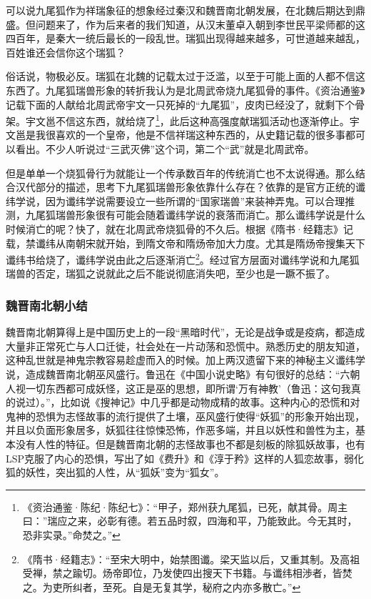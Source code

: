 \documentclass[UTF8, 12pt, A4paper]{article}
\begin{document}
可以说九尾狐作为祥瑞象征的想象经过秦汉和魏晋南北朝发展，在北魏后期达到鼎盛。但问题来了，作为后来者的我们知道，从汉末董卓入朝到李世民平梁师都的这四百年，是秦大一统后最长的一段乱世。瑞狐出现得越来越多，可世道越来越乱，百姓谁还会信你这个瑞狐？

俗话说，物极必反。瑞狐在北魏的记载太过于泛滥，以至于可能上面的人都不信这东西了。九尾狐瑞兽形象的转折我认为是北周武帝烧九尾狐骨的事件。《资治通鉴》记载下面的人献给北周武帝宇文一只死掉的“九尾狐”，皮肉已经没了，就剩下个骨架。宇文邕不信这东西，就给烧了\footnote{《资治通鉴·陈纪·陈纪七》：“甲子，郑州获九尾狐，已死，献其骨。周主曰：”瑞应之来，必彰有德。若五品时叙，四海和平，乃能致此。今无其时，恐非实录。”命焚之。”}，此后这种高强度献瑞狐活动也逐渐停止。宇文邕是我很喜欢的一个皇帝，他是不信祥瑞这种东西的，从史籍记载的很多事都可以看出。不少人听说过“三武灭佛”这个词，第二个“武”就是北周武帝。

但是单单一个烧狐骨行为就能让一个传承数百年的传统消亡也不太说得通。那么结合汉代部分的描述，思考下九尾狐瑞兽形象依靠什么存在？依靠的是官方正统的谶纬学说，因为谶纬学说需要设立一些所谓的“国家瑞兽”来装神弄鬼。可以合理推测，九尾狐瑞兽形象很有可能会随着谶纬学说的衰落而消亡。那么谶纬学说是什么时候消亡的呢？快了，就在北周武帝烧狐骨的不久后。根据《隋书·经籍志》记载，禁谶纬从南朝宋就开始，到隋文帝和隋炀帝加大力度。尤其是隋炀帝搜集天下谶纬书给烧了，谶纬学说由此之后逐渐消亡\footnote{《隋书·经籍志》：“至宋大明中，始禁图谶。梁天监以后，又重其制。及高祖受禅，禁之踰切。炀帝即位，乃发使四出搜天下书籍。与谶纬相渉者，皆焚之。为吏所纠者，至死。自是无复其学，秘府之内亦多散亡。”}。经过官方层面对谶纬学说和九尾狐瑞兽的否定，瑞狐之说就此之后不能说彻底消失吧，至少也是一蹶不振了。

\subsubsection{魏晋南北朝小结}

魏晋南北朝算得上是中国历史上的一段“黑暗时代”，无论是战争或是疫病，都造成大量非正常死亡与人口迁徙，社会处在一片动荡和恐慌中。熟悉历史的朋友知道，这种乱世就是神鬼宗教容易趁虚而入的时候。加上两汉遗留下来的神秘主义谶纬学说，造成魏晋南北朝巫风盛行。鲁迅在《中国小说史略》有句很好的总结：“六朝人视一切东西都可成妖怪，这正是巫的思想，即所谓‘万有神教’（鲁迅：这句我真的说过）。”，比如说《搜神记》中几乎都是动物成精的故事。这种内心的恐慌和对鬼神的恐惧为志怪故事的流行提供了土壤，巫风盛行使得“妖狐”的形象开始出现，并且以负面形象居多，妖狐往往惊悚恐怖，作恶多端，并且以妖性和兽性为主，基本没有人性的特征。但是魏晋南北朝的志怪故事也不都是刻板的除狐妖故事，也有LSP克服了内心的恐惧，写出了如《费升》和《淳于矜》这样的人狐恋故事，弱化狐的妖性，突出狐的人性，从“狐妖”变为“狐女”。
\end{document}
